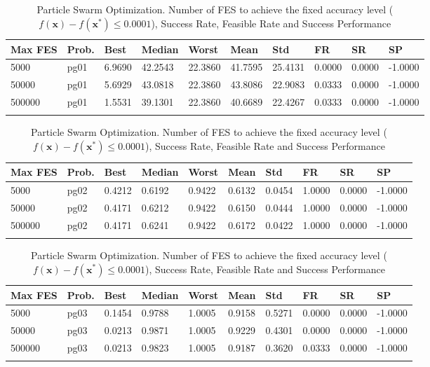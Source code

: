 \documentclass[10pt, a4paper]{book}
\begin{document}
\begin{center}
\begin{longtable}{l l l l l l l l l l}
\textbf{Max FES} & \textbf{Prob.} & \textbf{Best} & \textbf{Median} & \textbf{Worst} & \textbf{Mean} & \textbf{Std} & \textbf{FR} & \textbf{SR} & \textbf{SP} \\
\hline
5000 & pg01 & 6.9690 & 42.2543 & 22.3860 & 41.7595 & 25.4131 & 0.0000 & 0.0000 & -1.0000 \\
50000 & pg01 & 5.6929 & 43.0818 & 22.3860 & 43.8086 & 22.9083 & 0.0333 & 0.0000 & -1.0000 \\
500000 & pg01 & 1.5531 & 39.1301 & 22.3860 & 40.6689 & 22.4267 & 0.0333 & 0.0000 & -1.0000 \\

\caption{ Particle Swarm Optimization. Number of FES to achieve the fixed accuracy level ($f(\mathbf{x}) - f(\mathbf{x}^{*}) \leq 0.0001$), Success Rate, Feasible Rate and Success Performance }
\end{longtable}
\end{center}

\begin{center}
\begin{longtable}{l l l l l l l l l l}
\textbf{Max FES} & \textbf{Prob.} & \textbf{Best} & \textbf{Median} & \textbf{Worst} & \textbf{Mean} & \textbf{Std} & \textbf{FR} & \textbf{SR} & \textbf{SP} \\
\hline
5000 & pg02 & 0.4212 & 0.6192 & 0.9422 & 0.6132 & 0.0454 & 1.0000 & 0.0000 & -1.0000 \\
50000 & pg02 & 0.4171 & 0.6212 & 0.9422 & 0.6150 & 0.0444 & 1.0000 & 0.0000 & -1.0000 \\
500000 & pg02 & 0.4171 & 0.6241 & 0.9422 & 0.6172 & 0.0422 & 1.0000 & 0.0000 & -1.0000 \\

\caption{ Particle Swarm Optimization. Number of FES to achieve the fixed accuracy level ($f(\mathbf{x}) - f(\mathbf{x}^{*}) \leq 0.0001$), Success Rate, Feasible Rate and Success Performance }
\end{longtable}
\end{center}

\begin{center}
\begin{longtable}{l l l l l l l l l l}
\textbf{Max FES} & \textbf{Prob.} & \textbf{Best} & \textbf{Median} & \textbf{Worst} & \textbf{Mean} & \textbf{Std} & \textbf{FR} & \textbf{SR} & \textbf{SP} \\
\hline
5000 & pg03 & 0.1454 & 0.9788 & 1.0005 & 0.9158 & 0.5271 & 0.0000 & 0.0000 & -1.0000 \\
50000 & pg03 & 0.0213 & 0.9871 & 1.0005 & 0.9229 & 0.4301 & 0.0000 & 0.0000 & -1.0000 \\
500000 & pg03 & 0.0213 & 0.9823 & 1.0005 & 0.9187 & 0.3620 & 0.0333 & 0.0000 & -1.0000 \\

\caption{ Particle Swarm Optimization. Number of FES to achieve the fixed accuracy level ($f(\mathbf{x}) - f(\mathbf{x}^{*}) \leq 0.0001$), Success Rate, Feasible Rate and Success Performance }
\end{longtable}
\end{center}
\end{document}
